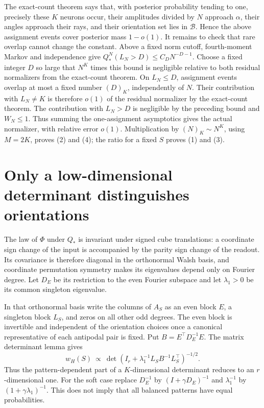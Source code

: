 \documentclass[11pt]{article}
\begin{document}
The exact-count theorem says that, with posterior probability tending
to one, precisely these $K$ neurons occur, their amplitudes divided by
$N$ approach $\alpha$, their angles approach their rays, and their
orientation set lies in $\mathcal B$. Hence the above assignment
events cover posterior mass $1-o(1)$. It remains to check that rare
overlap cannot change the constant. Above a fixed norm cutoff,
fourth-moment Markov and independence give
$Q_*^N(L_N>D)\le C_DN^{-D-1}$. Choose a fixed integer $D$ so large
that $N^K$ times this bound is negligible relative to both residual
normalizers from the exact-count theorem. On $L_N\le D$, assignment
events overlap at most a fixed number $(D)_K$, independently of $N$.
Their contribution with $L_N\ne K$ is therefore $o(1)$ of the residual
normalizer by the exact-count theorem. The contribution with $L_N>D$
is negligible by the preceding bound and $W_N\le1$.
Thus summing the one-assignment asymptotics gives the actual normalizer,
with relative error $o(1)$. Multiplication by $(N)_K\sim N^K$, using
$M=2K$, proves (2) and (4); the ratio for a fixed $S$ proves (1) and (3).

\section{Only a low-dimensional determinant distinguishes orientations}
The law of $\Phi$ under $Q_*$ is invariant under signed cube translations:
a coordinate sign change of the input is accompanied by the parity sign
change of the readout. Its covariance is therefore diagonal in the
orthonormal Walsh basis, and coordinate permutation symmetry makes its
eigenvalues depend only on Fourier degree. Let $D_E$ be its restriction
to the even Fourier subspace and let $\lambda_1>0$ be its common
singleton eigenvalue.

In that orthonormal basis write the columns of $A_S$ as an even block
$E$, a singleton block $L_S$, and zeros on all other odd degrees.
The even block is invertible and independent of the orientation choices
once a canonical representative of each antipodal pair is fixed. Put
$B=E^\top D_E^{-1}E$. The matrix determinant lemma gives
\[
 w_H(S)\ \propto\
 \det\left(I_r+\lambda_1^{-1}L_SB^{-1}L_S^\top\right)^{-1/2}.
\]
Thus the pattern-dependent part of a $K$-dimensional determinant reduces
to an $r$-dimensional one. For the soft case replace $D_E^{-1}$ by
$(I+\gamma D_E)^{-1}$ and $\lambda_1^{-1}$ by
$(1+\gamma\lambda_1)^{-1}$. This does not imply that all balanced
patterns have equal probabilities.
\end{document}

